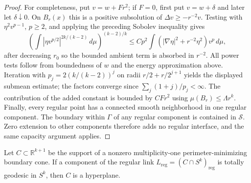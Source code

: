 \begin{proof}
For completeness, put $v=w+Fr^2$; if $F=0$, first put $v=w+\delta$
and later let $\delta\downarrow0$.  On $B_r(x)$ this is a positive
subsolution of $\Delta v\geq-r^{-2}v$.
Testing with $\eta^2v^{p-1}$, $p\geq2$, and applying the preceding
Sobolev inequality gives
\[
 \left(\int|\eta v^{p/2}|^{2k/(k-2)}\,d\mu\right)^{(k-2)/k}
 \leq Cp^2\int
       (|\nabla\eta|^2+r^{-2}\eta^2)v^p\,d\mu,
\]
after decreasing $r_0$ so the bounded ambient term is absorbed in
$r^{-2}$.  All power tests follow from boundedness of $w$ and the
energy approximation above.  Iteration with
$p_j=2(k/(k-2))^j$ on radii
$r/2+r/2^{j+1}$ yields the displayed submean estimate; the factors
converge since $\sum_j(1+j)/p_j<\infty$.
The contribution of the added constant is bounded by $CFr^2$ using
$\mu(B_r)\leq\Lambda r^k$.
Finally, every regular point has a connected smooth neighborhood in
one regular component.  The boundary within $\Gamma$ of any regular
component is contained in $\mathcal S$.  Zero extension to other
components therefore adds no regular interface, and the same
capacity argument applies.
\end{proof}

\begin{lemma}
\label{lem:variation:flat-link-component}
Let $C\subset\mathbb R^{k+1}$ be the support of a nonzero
multiplicity-one perimeter-minimizing boundary cone.  If a component
of the regular link $L_{\mathrm{reg}}=(C\cap S^k)_{\mathrm{reg}}$
is totally geodesic in $S^k$, then $C$ is a hyperplane.
\end{lemma}


